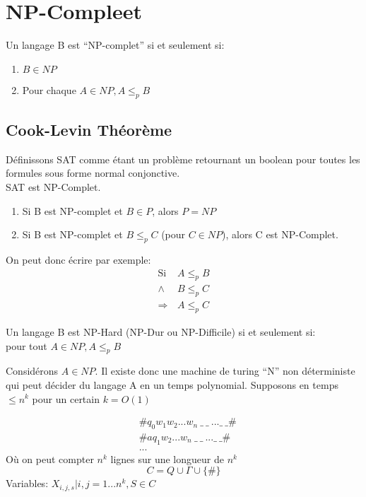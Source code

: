 \documentclass[a4paper,12pt]{article}
\begin{document}
\section{NP-Compleet}
  \begin{defBox}
    Un langage B est ``NP-complet'' si et seulement si:
    \begin{enumerate}
      \item $B \in NP$
      \item Pour chaque $A \in NP, A \leq_p B$
    \end{enumerate}
  \end{defBox}
  
  \subsection{Cook-Levin Théorème}
    Définissons SAT comme étant un problème retournant un boolean pour toutes les formules sous forme normal conjonctive.\\
    SAT est NP-Complet.
    
    \begin{enumerate}
      \item Si B est NP-complet et $B \in P$, alors $P = NP$
      \item Si B est NP-complet et $B \leq_p C$ (pour $C \in NP$), alors C est NP-Complet.
    \end{enumerate}
    On peut donc écrire par exemple:
    \begin{align*}
      \text{Si } &A \leq_p B\\
      \wedge &B \leq_p C\\
      \Rightarrow &A \leq_p C
    \end{align*}

    
    \begin{defBox}
      Un langage B est NP-Hard (NP-Dur ou NP-Difficile) si et seulement si:\\
      pour tout $A \in NP, A \leq_p B$
    \end{defBox}
    Considérons $A \in NP$.  Il existe donc une machine de turing ``N'' non déterministe qui peut décider du langage A en un temps polynomial.  Supposons en temps $\leq n^k$ pour un certain $k = O(1)$
    
    \begin{align*}
      &\# q_0 w_1 w_2 ... w_n\ \_\ \_\ ... \_\ \_\#\\
      &\# a q_1 w_2 ... w_n\ \_\ \_\ ... \_\ \_\#\\
      &...
    \end{align*}
    Où on peut compter $n^k$ lignes sur une longueur de $n^k$\\
    $$C = Q \cup \Gamma \cup \{\#\}$$
    Variables: $X_{i, j, s} | i,j = 1...n^k, S \in C $
    
\end{document}
